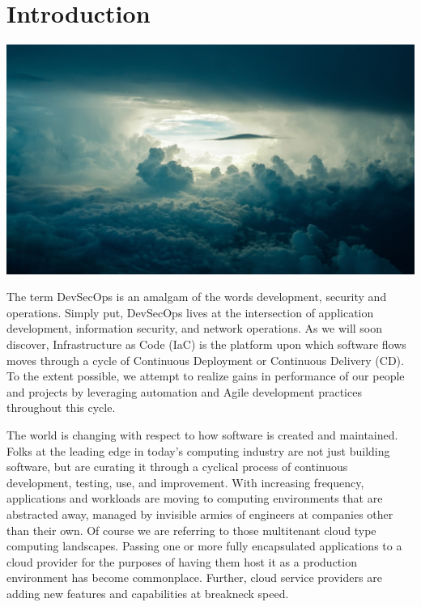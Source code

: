 \chapter{Introduction}

\includegraphics[scale=0.85]{../images/sky-690293_1920.jpg}

\justify
The term DevSecOps is an amalgam of the words development, security and
operations. Simply put, DevSecOps lives at the intersection of
application development, information security, and network operations.
As we will soon discover, Infrastructure as Code (IaC) is the platform
upon which software flows moves through a cycle of Continuous Deployment or Continuous Delivery
(CD). To the extent possible, we attempt to realize gains in performance
of our people and projects by leveraging automation and Agile
development practices throughout this cycle.

\justify
The world is changing with respect to how software is created and maintained. Folks at the leading edge in today's computing industry are not just building software, but are curating it through a cyclical
process of continuous development, testing, use, and improvement. With increasing frequency, applications and workloads are moving to computing
environments that are abstracted away, managed by invisible armies of engineers at companies other than their own. Of course we are referring
to those multitenant cloud type computing landscapes. Passing one or more fully encapsulated applications to a cloud provider for the purposes of having them host it as a production environment has become
commonplace. Further, cloud service providers are adding new features and capabilities at breakneck speed.

